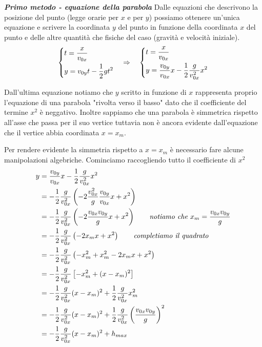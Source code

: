 \documentclass{article}
\begin{document}
\textbf{\textit{Primo metodo - equazione della parabola}}
\newline
Dalle equazioni che descrivono la posizione del punto (legge orarie per $x$ e per $y$) possiamo ottenere un'unica equazione e scrivere la coordinata $y$ del punto in funzione della coordinata $x$ del punto e delle altre quantità che fisiche del caso (gravità e velocità iniziale).
\begin{equation}
  \begin{dcases}
    t = \frac{x}{v_{0x}}\\
    y = v_{0y} t - \frac{1}{2}gt^2
  \end{dcases}
  \quad\Rightarrow\quad
  \begin{dcases}
    t = \frac{x}{v_{0x}}\\
    y = \frac{v_{0y}}{v_{0x}} x - \frac{1}{2}\frac{g}{v_{0x}^2}x^2
  \end{dcases}
\end{equation}

Dall'ultima equazione notiamo che $y$ scritto in funzione di $x$ rappresenta proprio l'equazione di una parabola "rivolta verso il basso" dato che il coefficiente del termine $x^2$ è neggativo.
Inoltre sappiamo che una parabola è simmetrica rispetto all'asse che passa per il suo vertice tuttavia non è ancora evidente dall'equazione che il vertice abbia coordinata $x=x_m$.

Per rendere evidente la simmetria rispetto a $x=x_m$ è necessario fare alcune manipolazioni algebriche. Cominciamo raccogliendo tutto il coefficiente di $x^2$
\begin{align}
  y &= \frac{v_{0y}}{v_{0x}} x - \frac{1}{2}\frac{g}{v_{0x}^2}x^2 \\
    &= -\frac{1}{2}\frac{g}{v_{0x}^2} \left(-2\frac{v_{0x}^2}{g}\frac{v_{0y}}{v_{0x}}x + x^2\right) \\
    &= -\frac{1}{2}\frac{g}{v_{0x}^2} \left(-2\frac{v_{0x}v_{0y}}{g}x + x^2\right) \qquad\text{\textit{notiamo che $x_m=\frac{v_{0x}v_{0y}}{g}$}} \\
    &= -\frac{1}{2}\frac{g}{v_{0x}^2} \left(-2x_mx + x^2\right) \qquad \text{\textit{completiamo il quadrato}} \\
    &= -\frac{1}{2}\frac{g}{v_{0x}^2} \left(-x_m^2 + x_m^2 -2x_mx + x^2\right) \\
    &= -\frac{1}{2}\frac{g}{v_{0x}^2} \left[-x_m^2 + (x-x_m)^2\right] \\
    &= -\frac{1}{2}\frac{g}{v_{0x}^2} (x-x_m)^2 + \frac{1}{2}\frac{g}{v_{0x}^2}x_m^2 \\
    &= -\frac{1}{2}\frac{g}{v_{0x}^2} (x-x_m)^2 + \frac{1}{2}\frac{g}{v_{0x}^2}\left(\frac{v_{0x}v_{0y}}{g}\right)^2 \\
    &= -\frac{1}{2}\frac{g}{v_{0x}^2} (x-x_m)^2 + h_{max}
\end{align}
\end{document}
